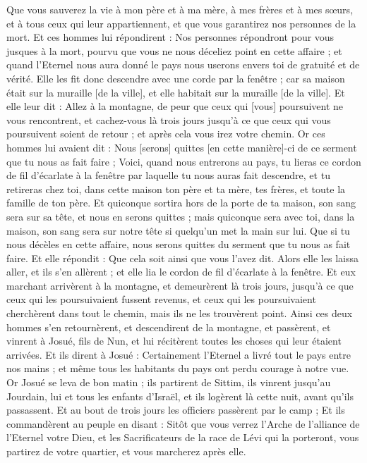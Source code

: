 \begin{multicols}{2}
Que vous sauverez la vie à mon père et à ma mère, à mes frères et à mes sœurs, et à tous ceux qui leur appartiennent, et que vous garantirez nos personnes de la mort.
Et ces hommes lui répondirent : Nos personnes répondront pour vous jusques à la mort, pourvu que vous ne nous déceliez point en cette affaire ; et quand l'Eternel nous aura donné le pays nous userons envers toi de gratuité et de vérité.
Elle les fit donc descendre avec une corde par la fenêtre ; car sa maison était sur la muraille [de la ville], et elle habitait sur la muraille [de la ville].
Et elle leur dit : Allez à la montagne, de peur que ceux qui [vous] poursuivent ne vous rencontrent, et cachez-vous là trois jours jusqu'à ce que ceux qui vous poursuivent soient de retour ; et après cela vous irez votre chemin.
Or ces hommes lui avaient dit : Nous [serons] quittes [en cette manière]-ci de ce serment que tu nous as fait faire ;
Voici, quand nous entrerons au pays, tu lieras ce cordon de fil d'écarlate à la fenêtre par laquelle tu nous auras fait descendre, et tu retireras chez toi, dans cette maison ton père et ta mère, tes frères, et toute la famille de ton père.
Et quiconque sortira hors de la porte de ta maison, son sang sera sur sa tête, et nous en serons quittes ; mais quiconque sera avec toi, dans la maison, son sang sera sur notre tête si quelqu'un met la main sur lui.
Que si tu nous décèles en cette affaire, nous serons quittes du serment que tu nous as fait faire.
Et elle répondit : Que cela soit ainsi que vous l'avez dit. Alors elle les laissa aller, et ils s'en allèrent ; et elle lia le cordon de fil d'écarlate à la fenêtre.
Et eux marchant arrivèrent à la montagne, et demeurèrent là trois jours, jusqu'à ce que ceux qui les poursuivaient fussent revenus, et ceux qui les poursuivaient cherchèrent dans tout le chemin, mais ils ne les trouvèrent point.
Ainsi ces deux hommes s'en retournèrent, et descendirent de la montagne, et passèrent, et vinrent à Josué, fils de Nun, et lui récitèrent toutes les choses qui leur étaient arrivées.
Et ils dirent à Josué : Certainement l'Eternel a livré tout le pays entre nos mains ; et même tous les habitants du pays ont perdu courage à notre vue.
\VerseOne{}Or Josué se leva de bon matin ; ils partirent de Sittim, ils vinrent jusqu'au Jourdain, lui et tous les enfants d'Israël, et ils logèrent là cette nuit, avant qu'ils passassent.
Et au bout de trois jours les officiers passèrent par le camp ;
Et ils commandèrent au peuple en disant : Sitôt que vous verrez l'Arche de l'alliance de l'Eternel votre Dieu, et les Sacrificateurs de la race de Lévi qui la porteront, vous partirez de votre quartier, et vous marcherez après elle.

\end{multicols}
